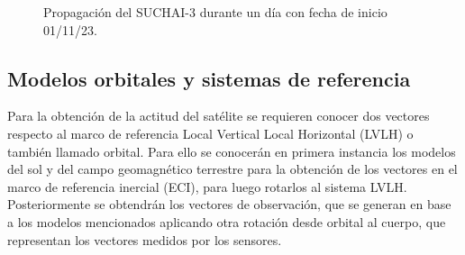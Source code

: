 \begin{figure}[h]
	\centering
	\begin{subfigure}[t]{0.68\textwidth}
	\end{subfigure}
	\begin{subfigure}[t]{0.68\textwidth}
	\end{subfigure}
	\caption{Propagación del SUCHAI-3 durante un día con fecha de inicio 01/11/23.}\label{fig:pos-vel}
\end{figure}


\subsection{Modelos orbitales y sistemas de referencia}

Para la obtención de la actitud del satélite se requieren conocer dos vectores respecto al marco de referencia Local Vertical Local Horizontal (LVLH) o también llamado orbital.  Para ello se conocerán en primera instancia los modelos del sol y del campo geomagnético terrestre para la obtención de los vectores en el marco de referencia inercial (ECI), para luego rotarlos al sistema LVLH. Posteriormente se obtendrán los vectores de observación, que se generan en base a los modelos mencionados aplicando otra rotación desde orbital al cuerpo, que representan los vectores medidos por los sensores.

